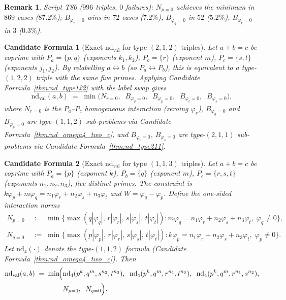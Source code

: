 \documentclass[12pt]{article}
\newtheorem{remark}{Remark}
\newtheorem{candidate}{Candidate Formula}
\theoremstyle{definition}
\begin{document}
\begin{remark}
  Script T80 ($996$ triples, $0$ failures): $N_{p=0}$ achieves the minimum in
  $869$ cases ($87.2\%$); $B_{\varphi_r=0}$ wins in $72$ cases ($7.2\%$),
  $B_{\varphi_q=0}$ in $52$ ($5.2\%$), $B_{\varphi_t=0}$ in $3$ ($0.3\%$).
\end{remark}

\begin{candidate}[Exact $\mathrm{nd}_{\mathrm{val}}$ for type $(2,1,2)$ triples]\label{cor:nd_type212}
  Let $a + b = c$ be coprime with $P_a = \{p, q\}$ (exponents $k_1, k_2$),
  $P_b = \{r\}$ (exponent $m$), $P_c = \{s, t\}$ (exponents $j_1, j_2$).
  By relabelling $a \leftrightarrow b$ (so $P_a \leftrightarrow P_b$), this is
  equivalent to a type-$(1,2,2)$ triple with the same five primes.
  Applying Candidate Formula~\ref{thm:nd_type122} with the label swap gives
  \[
    \mathrm{nd}_{\mathrm{val}}(a,b) \;=\; \min\!\bigl(
      N_{r=0},\;\;
      B_{\varphi_q=0},\;\;
      B_{\varphi_p=0},\;\;
      B_{\varphi_t=0},\;\;
      B_{\varphi_s=0}
    \bigr),
  \]
  where $N_{r=0}$ is the $P_a$--$P_c$ homogeneous interaction (zeroing $\varphi_r$),
  $B_{\varphi_q=0}$ and $B_{\varphi_p=0}$ are type-$(1,1,2)$ sub-problems via
  Candidate Formula~\ref{thm:nd_omega4_two_c}, and $B_{\varphi_t=0}$, $B_{\varphi_s=0}$
  are type-$(2,1,1)$ sub-problems via Candidate Formula~\ref{thm:nd_type211}.
\end{candidate}

\begin{candidate}[Exact $\mathrm{nd}_{\mathrm{val}}$ for type $(1,1,3)$ triples]\label{thm:nd_type113}
  Let $a + b = c$ be coprime with $P_a = \{p\}$ (exponent $k$),
  $P_b = \{q\}$ (exponent $m$), $P_c = \{r, s, t\}$ (exponents $n_1, n_2, n_3$),
  five distinct primes.  The constraint is $k\varphi_p + m\varphi_q
  = n_1\varphi_r + n_2\varphi_s + n_3\varphi_t$ and $W = \varphi_q - \varphi_p$.
  Define the \emph{one-sided interaction norms}
  \begin{align*}
    N_{p=0} &\;:=\; \min\bigl\{
      \max(q|\varphi_q|,\,r|\varphi_r|,\,s|\varphi_s|,\,t|\varphi_t|) :
      m\varphi_q = n_1\varphi_r + n_2\varphi_s + n_3\varphi_t,\;\varphi_q \ne 0
    \bigr\},\\
    N_{q=0} &\;:=\; \min\bigl\{
      \max(p|\varphi_p|,\,r|\varphi_r|,\,s|\varphi_s|,\,t|\varphi_t|) :
      k\varphi_p = n_1\varphi_r + n_2\varphi_s + n_3\varphi_t,\;\varphi_p \ne 0
    \bigr\}.
  \end{align*}
  Let $\mathrm{nd}_{4}(\cdot)$ denote the type-$(1,1,2)$ formula
  (Candidate Formula~\ref{thm:nd_omega4_two_c}).  Then
  \begin{align*}
    \mathrm{nd}_{\mathrm{val}}(a,b) \;=\; \min\!\Bigl(
      &\mathrm{nd}_{4}(p^k,q^m,s^{n_2},t^{n_3}),\;\;
       \mathrm{nd}_{4}(p^k,q^m,r^{n_1},t^{n_3}),\;\;
       \mathrm{nd}_{4}(p^k,q^m,r^{n_1},s^{n_2}),\\
      &N_{p=0},\;\; N_{q=0}
    \Bigr).
  \end{align*}
\end{candidate}
\end{document}
